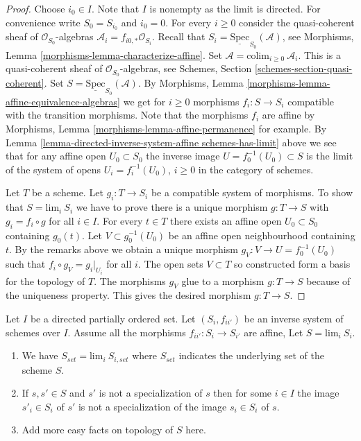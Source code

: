 \begin{proof}
Choose $i_0 \in I$. Note that $I$ is nonempty as the limit is directed.
For convenience write $S_0 = S_{i_0}$ and $i_0 = 0$.
For every $i \geq 0$ consider the quasi-coherent sheaf of
$\mathcal{O}_{S_0}$-algebras $\mathcal{A}_i = f_{i0,*}\mathcal{O}_{S_i}$.
Recall that $S_i = \underline{\text{Spec}}_{S_0}(\mathcal{A})$,
see Morphisms, Lemma \ref{morphisms-lemma-characterize-affine}.
Set $\mathcal{A} = \text{colim}_{i \geq 0}\ \mathcal{A}_i$.
This is a quasi-coherent sheaf of $\mathcal{O}_{S_0}$-algebras,
see Schemes, Section \ref{schemes-section-quasi-coherent}.
Set $S = \underline{\text{Spec}}_{S_0}(\mathcal{A})$.
By Morphisms, Lemma \ref{morphisms-lemma-affine-equivalence-algebras}
we get for $i \geq 0$ morphisms $f_i : S \to S_i$ compatible with
the transition morphisms. Note that the morphisms $f_i$ are
affine by Morphisms, Lemma \ref{morphisms-lemma-affine-permanence} for example.
By Lemma \ref{lemma-directed-inverse-system-affine schemes-has-limit} above
we see that for any affine open $U_0 \subset S_0$ the
inverse image $U = f_0^{-1}(U_0) \subset S$ is the limit of the
system of opens $U_i = f_i^{-1}(U_0)$, $i \geq 0$ in the
category of schemes.

\medskip\noindent
Let $T$ be a scheme. Let $g_i : T \to S_i$ be a compatible system
of morphisms. To show that $S = \text{lim}_i\ S_i$ we have
to prove there is a unique morphism $g : T \to S$ with
$g_i = f_i \circ g$ for all $i \in I$.
For every $t \in T$ there exists an affine open
$U_0 \subset S_0$ containing $g_0(t)$. Let $V \subset g_0^{-1}(U_0)$
be an affine open neighbourhood containing $t$.
By the remarks above we obtain a unique morphism
$g_V : V \to U = f_0^{-1}(U_0)$ such that $f_i \circ g_V = g_i|_{U_i}$
for all $i$. The open sets $V \subset T$ so constructed form
a basis for the topology of $T$. The morphisms $g_V$ glue to a morphism
$g : T \to S$ because of the uniqueness property. This gives the
desired morphism $g : T \to S$.
\end{proof}

\begin{lemma}
\label{lemma-topology-limit}
Let $I$ be a directed partially ordered set.
Let $(S_i, f_{ii'})$ be an inverse system of schemes over $I$.
Assume all the morphisms $f_{ii'} : S_i \to S_{i'}$ are affine,
Let $S = \text{lim}_i\ S_i$.
\begin{enumerate}
\item We have $S_{set} = \text{lim}_i\ S_{i, set}$ where $S_{set}$
indicates the underlying set of the scheme $S$.
\item If $s, s' \in S$ and $s'$ is not a specialization of $s$
then for some $i \in I$ the image $s'_i \in S_i$ of $s'$ is not
a specialization of the image $s_i \in S_i$ of $s$.
\item Add more easy facts on topology of $S$ here.
\end{enumerate}
\end{lemma}

